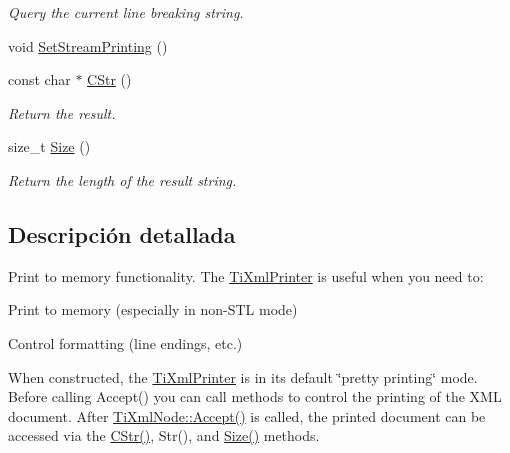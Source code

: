 \begin{DoxyCompactItemize}
\begin{DoxyCompactList}\small\item\em \-Query the current line breaking string. \end{DoxyCompactList}\item 
void \hyperlink{classTiXmlPrinter_ab23a90629e374cb1cadca090468bbd19}{\-Set\-Stream\-Printing} ()
\item 
\hypertarget{classTiXmlPrinter_a859eede9597d3e0355b77757be48735e}{const char $\ast$ \hyperlink{classTiXmlPrinter_a859eede9597d3e0355b77757be48735e}{\-C\-Str} ()}\label{classTiXmlPrinter_a859eede9597d3e0355b77757be48735e}

\begin{DoxyCompactList}\small\item\em \-Return the result. \end{DoxyCompactList}\item 
\hypertarget{classTiXmlPrinter_ad01375ae9199bd2f48252eaddce3039d}{size\-\_\-t \hyperlink{classTiXmlPrinter_ad01375ae9199bd2f48252eaddce3039d}{\-Size} ()}\label{classTiXmlPrinter_ad01375ae9199bd2f48252eaddce3039d}

\begin{DoxyCompactList}\small\item\em \-Return the length of the result string. \end{DoxyCompactList}\end{DoxyCompactItemize}


\subsection{\-Descripción detallada}
\-Print to memory functionality. \-The \hyperlink{classTiXmlPrinter}{\-Ti\-Xml\-Printer} is useful when you need to\-:


\begin{DoxyEnumerate}
\item \-Print to memory (especially in non-\/\-S\-T\-L mode)
\item \-Control formatting (line endings, etc.)
\end{DoxyEnumerate}

\-When constructed, the \hyperlink{classTiXmlPrinter}{\-Ti\-Xml\-Printer} is in its default \char`\"{}pretty printing\char`\"{} mode. \-Before calling \-Accept() you can call methods to control the printing of the \-X\-M\-L document. \-After \hyperlink{classTiXmlNode_acc0f88b7462c6cb73809d410a4f5bb86}{\-Ti\-Xml\-Node\-::\-Accept()} is called, the printed document can be accessed via the \hyperlink{classTiXmlPrinter_a859eede9597d3e0355b77757be48735e}{\-C\-Str()}, \-Str(), and \hyperlink{classTiXmlPrinter_ad01375ae9199bd2f48252eaddce3039d}{\-Size()} methods.

